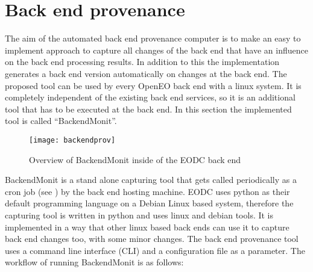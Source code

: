 \documentclass[draft,final]{vutinfth} %
\begin{document}
\section{Back end provenance}\label{Implementation:Back end provenance}
The aim of the automated back end provenance computer is to make an easy to implement approach to capture all changes of the back end that have an influence on the back end processing results. In addition to this the implementation generates a back end version automatically on changes at the back end. The proposed tool can be used by every OpenEO back end with a linux system. It is completely independent of the existing back end services, so it is an additional tool that has to be executed at the back end. In this section the implemented tool is called “BackendMonit”. 

\begin{figure}[h]
	\centering
	\texttt{[image: backendprov]}
	\caption{Overview of BackendMonit inside of the EODC back end}
	\label{fig:backendprov} %
\end{figure}

BackendMonit is a stand alone capturing tool that gets called periodically as a cron job (see \cite{crontab}) by the back end hosting machine. EODC uses python as their default programming language on a Debian Linux based system, therefore the capturing tool is written in python and uses linux and debian tools. It is implemented in a way that other linux based back ends can use it to capture back end changes too, with some minor changes. The back end provenance tool uses a command line interface (CLI)  and a configuration file as a parameter. 
The workflow of running BackendMonit is as follows: 
\end{document}
